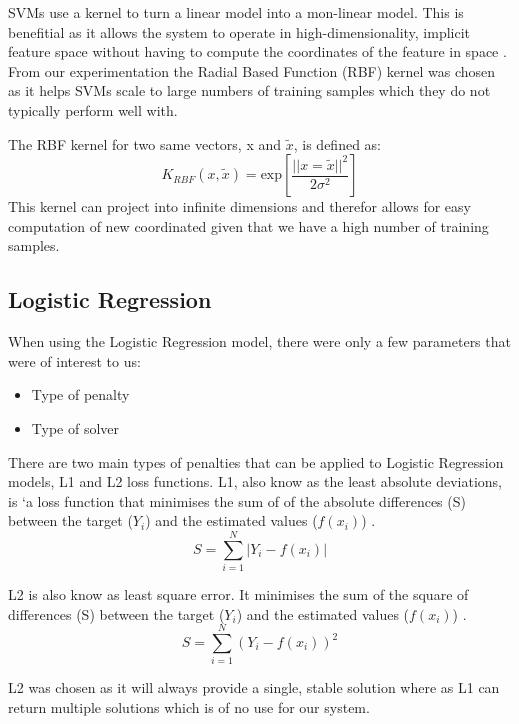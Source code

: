 \documentclass[bsc,frontabs,twoside,singlespacing,parskip,deptreport]{infthesis}     %
\begin{document}
 SVMs use a kernel to turn a linear model into a mon-linear model. This is benefitial as it allows the system
 to operate in high-dimensionality, implicit feature space without having to compute the coordinates of the feature
 in space \cite{hofmann2008kernel}.
 From our experimentation the Radial Based Function (RBF) kernel was chosen as it helps SVMs scale to large numbers of
 training samples which they do not typically perform well with.

 The RBF kernel for two same vectors, x and $\tilde{x}$, is defined as:
 \begin{equation}
   K_{RBF} (x, \tilde{x}) = \text{exp}[ \frac{||x =\tilde{x}||^2}{2\sigma^2}]\nonumber
 \end{equation}
\cite{hofmann2008kernel}
 This kernel can project into infinite dimensions and therefor allows for easy computation of new coordinated given that
 we have a high number of training samples.
 
 \subsection{Logistic Regression}\label{sec:log-reg}
 When using the Logistic Regression model, there were only a few parameters that were of interest to us:
 \begin{itemize}
   \item Type of penalty
   \item Type of solver
 \end{itemize}

 There are two main types of penalties that can be applied to Logistic Regression models, L1 and L2 loss functions.
 L1, also know as  the least absolute deviations, is `a loss function that minimises the sum of of the absolute
 differences (S) between the target ($Y_i$) and the estimated values ($f(x_{i})$) \cite{l1l2}.
 \begin{equation}
   S = \sum_{i=1}^{N} | Y_i - f(x_i)|\nonumber
   \end{equation}
 
 L2 is also know as least square error. It minimises the sum of the square of differences (S) between
 the target ($Y_i$) and the estimated values ($f(x_{i})$) \cite{l1l2}.
 \begin{equation}
   S = \sum_{i=1}^{N} ( Y_i - f(x_i))^2\nonumber
   \end{equation}

 L2 was chosen as it will always provide a single, stable solution where as L1 can return multiple solutions
 which is of no use for our system.
\end{document}
